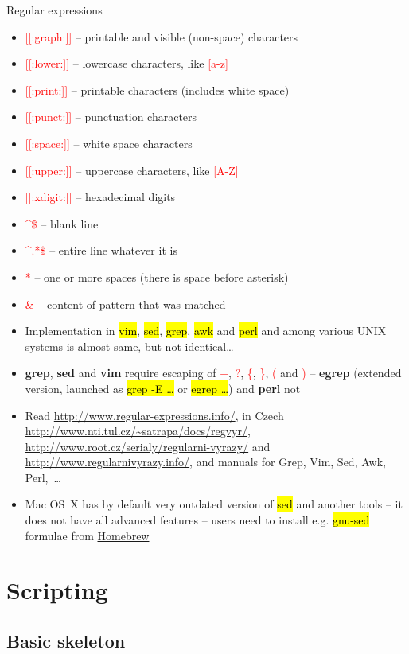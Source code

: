 \documentclass[compress, ucs, xelatex, 11pt, xcolor=svgnames,
  hyperref={
    bookmarks=true,
    unicode=true,
    colorlinks=true,
    pdftitle={Linux, command line and MetaCentrum},
    plainpages=false,
    pdfauthor={Vojtech Zeisek},
    pdfsubject={Course about use of Linux command line, writing shell scripts and using MetaCentrum of CESNET},
    pdfcreator={XeLaTeX},
    pdfkeywords={Linux, GNU, BASH, shell, command line, MetaCentrum},
    linkcolor=Red,
    anchorcolor=Blue,
    citecolor=Purple,
    filecolor=DodgerBlue,
    menucolor=DarkOrchid,
    urlcolor=DeepSkyBlue,
    pdftex},
  url={hyphens, lowtilde} %
  ]{beamer}
\renewcommand{\texttt}[1]{\hl{\ttfamily #1}}
\renewcommand{\alert}[1]{\textcolor{red}{#1}}
\begin{document}
\begin{frame}[allowframebreaks]{Regular expressions}
\begin{itemize}
  \item \alert{[[:graph:]]} -- printable and visible (non-space) characters
  \item \alert{[[:lower:]]} -- lowercase characters, like \alert{[a-z]}
  \item \alert{[[:print:]]} -- printable characters (includes white space)
  \item \alert{[[:punct:]]} -- punctuation characters
  \item \alert{[[:space:]]} -- white space characters
  \item \alert{[[:upper:]]} -- uppercase characters, like \alert{[A-Z]}
  \item \alert{[[:xdigit:]]} -- hexadecimal digits
  \item \alert{\textasciicircum\$} -- blank line
  \item \alert{\textasciicircum.*\$} -- entire line whatever it is
  \item \alert{ *} -- one or more spaces (there is space before asterisk)
  \item \alert{\&} -- content of pattern that was matched
  \item Implementation in \texttt{vim}, \texttt{sed}, \texttt{grep}, \texttt{awk} and \texttt{perl} and among various UNIX systems is almost same, but not identical\ldots
  \item \textbf{grep}, \textbf{sed} and \textbf{vim} require escaping of \alert{+}, \alert{?}, \alert{\{}, \alert{\}}, \alert{(} and \alert{)} -- \textbf{egrep} (extended version, launched as \texttt{grep -E \ldots} or \texttt{egrep \ldots}) and \textbf{perl} not
  \item Read \url{http://www.regular-expressions.info/}, in Czech \url{http://www.nti.tul.cz/~satrapa/docs/regvyr/}, \url{http://www.root.cz/serialy/regularni-vyrazy/} and \url{http://www.regularnivyrazy.info/}, and manuals for Grep, Vim, Sed, Awk, Perl,~\ldots
  \item Mac OS~X has by default very outdated version of \texttt{sed} and another tools -- it does not have all advanced features -- users need to install e.g. \texttt{gnu-sed} formulae from \href{http://brew.sh/}{Homebrew}
\end{itemize}
\end{frame}

\section{Scripting}

\subsection{Basic skeleton}
\end{document}
